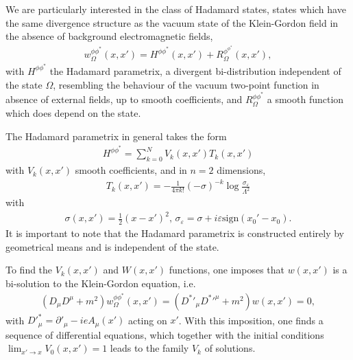 We are particularly interested in the class of Hadamard states, states which have the same divergence  structure as the vacuum state of the Klein-Gordon field in the absence of background electromagnetic fields,
\begin{align}
	w_\Omega^{\phi \phi^*}(x, x') = H^{\phi\phi^*}(x, x') + R_\Omega^{\phi^\phi^*}(x, x'),
\end{align}
with $H^{\phi \phi^*}$ the Hadamard parametrix, a divergent bi-distribution independent of the state $\Omega$, resembling the behaviour of the vacuum two-point function in absence of external fields, up to smooth coefficients, and $R_\Omega^{\phi\phi^*}$ a smooth function which does depend on the state.

The Hadamard parametrix in general takes the form
\begin{align}
H^{\phi\phi^*} = \sum_{k=0}^{N} V_k(x, x') T_k(x, x')
\end{align}
with $V_k(x, x')$ smooth coefficients, and in $n=2$ dimensions,
\begin{align}
	T_k(x,x') = 
	-\frac{1}{ 4\pi k!} \left( -\sigma \right) ^{  -k} \log \frac{\sigma_\varepsilon}{\Lambda^2}  
\end{align}
with  
\begin{align}
	\sigma(x, x') = \frac{1}{2}(x-x')^2, \, \sigma_\varepsilon = \sigma + i\varepsilon \text{sign} (x_{0}'-x_0).
\end{align}
It is important to note that the Hadamard parametrix is constructed entirely by geometrical means and is independent of the state. 

To find the $V_k( x, x')$ and $W(x, x')$  functions, one imposes that $w(x, x')$ is a bi-solution to the Klein-Gordon equation, i.e. 
\begin{align}
	(D_\mu D^\mu  + m^2)w^{\phi \phi^*}_\Omega(x, x') = ( D^*'_\mu D^*'^{\mu} + m^2)w(x, x') = 0,
\end{align}
with $D'^*_\mu = \partial'_\mu - ieA_\mu(x')$ acting on  $x'$.
With this imposition, one finds a sequence of differential equations, which together with the initial conditions $\lim_{x' \to x} V_0(x, x') = 1$ leads to the family $V_k$ of solutions.

